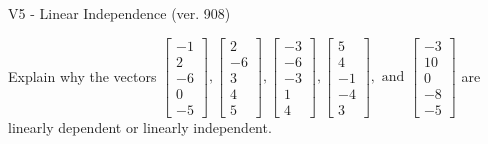 \begin{exercise}
  \begin{exerciseTitle}V5 - Linear Independence (ver. 908)\end{exerciseTitle}
  \begin{exerciseStatement}
    Explain why the vectors \(\left[\begin{array}{r}
-1 \\
2 \\
-6 \\
0 \\
-5
\end{array}\right] , \left[\begin{array}{r}
2 \\
-6 \\
3 \\
4 \\
5
\end{array}\right] , \left[\begin{array}{r}
-3 \\
-6 \\
-3 \\
1 \\
4
\end{array}\right] , \left[\begin{array}{r}
5 \\
4 \\
-1 \\
-4 \\
3
\end{array}\right] , \text{ and } \left[\begin{array}{r}
-3 \\
10 \\
0 \\
-8 \\
-5
\end{array}\right]\) are linearly dependent or linearly independent.	



\end{exerciseStatement}
\end{exercise}
